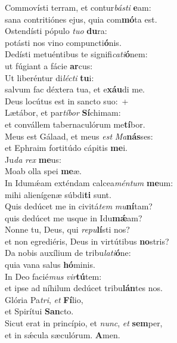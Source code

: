 \evenverse Commovísti terram, et contur\textit{bá}\textit{sti} \textbf{e}am:~\*\\
\evenverse sana contritiónes ejus, quia com\textbf{mó}ta est.\\
\oddverse Ostendísti pópulo \textit{tu}\textit{o} \textbf{du}ra:~\*\\
\oddverse potásti nos vino compuncti\textbf{ó}nis.\\
\evenverse Dedísti metuéntibus te signifi\textit{ca}\textit{ti}\textbf{ó}nem:~\*\\
\evenverse ut fúgiant a fácie \textbf{ar}cus:\\
\oddverse Ut liberéntur di\textit{lé}\textit{cti} \textbf{tu}i:~\*\\
\oddverse salvum fac déxtera tua, et e\textbf{xáu}di me.\\
\evenverse Deus locútus est in sancto suo:~+\\
\evenverse  Lætábor, et par\textit{tí}\textit{bor} \textbf{Sí}chimam:~\*\\
\evenverse et convállem tabernaculórum me\textbf{tí}bor.\\
\oddverse Meus est Gálaad, et meus \textit{est} \textit{Ma}\textbf{nás}ses:~\*\\
\oddverse et Ephraim fortitúdo cápitis \textbf{me}i.\\
\evenverse Ju\textit{da} \textit{rex} \textbf{me}us:~\*\\
\evenverse Moab olla spei \textbf{me}æ.\\
\oddverse In Idumǽam exténdam calcea\textit{mén}\textit{tum} \textbf{me}um:~\*\\
\oddverse mihi alienígenæ súbdi\textbf{ti} sunt.\\
\evenverse Quis dedúcet me in civitá\textit{tem} \textit{mu}\textbf{ní}tam?~\*\\
\evenverse quis dedúcet me usque in Idu\textbf{mǽ}am?\\
\oddverse Nonne tu, Deus, qui \textit{re}\textit{pu}\textbf{lí}sti nos?~\*\\
\oddverse et non egrediéris, Deus in virtútibus \textbf{no}stris?\\
\evenverse Da nobis auxílium de tribu\textit{la}\textit{ti}\textbf{ó}ne:~\*\\
\evenverse quia vana salus \textbf{hó}minis.\\
\oddverse In Deo facié\textit{mus} \textit{vir}\textbf{tú}tem:~\*\\
\oddverse et ipse ad níhilum dedúcet tribu\textbf{lán}tes nos.\\
\evenverse Glória Pa\textit{tri}, \textit{et} \textbf{Fí}lio,~\*\\
\evenverse et Spirítui \textbf{San}cto.\\
\oddverse Sicut erat in princípio, et \textit{nunc}, \textit{et} \textbf{sem}per,~\*\\
\oddverse et in sǽcula sæculórum. \textbf{A}men.\\
